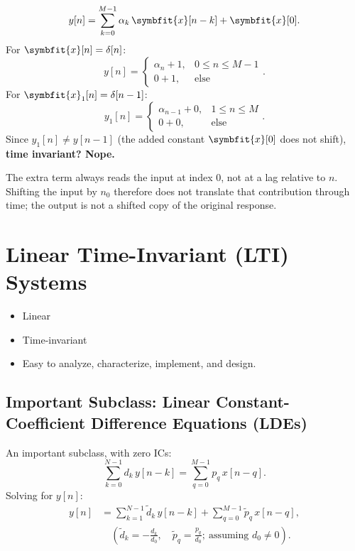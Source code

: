 \documentclass[handout_subfiles_root.tex]{subfiles}
\begin{document}
\begin{examplebox}[title={Example (A System that is \emph{Not} Time-Invariant)}]
$$y[n] = \sum_{k=0}^{M-1}\alpha_k\,\symbfit{x}[n-k] + \symbfit{x}[0].$$
For $\symbfit{x}[n] = \delta[n]$:
$$y[n] = \begin{cases} \alpha_n + 1, & 0\le n\le M-1\\ 0+1, & \text{else}
\end{cases}.$$
\noindent{}For $\symbfit{x}_1[n] = \delta[n-1]$:
$$y_1[n] = \begin{cases} \alpha_{n-1} + 0, & 1\le n\le M\\ 0+0, & \text{else}
\end{cases}.$$
Since $y_1[n] \ne y[n-1]$ (the added constant $\symbfit{x}[0]$ does not shift),
\textbf{time invariant? Nope.}

\noindent The extra term always reads the input at index $0$, not at a lag
relative to $n$. Shifting the input by $n_0$ therefore does not translate
that contribution through time; the output is not a shifted copy of the
original response.
\end{examplebox}

\section{Linear Time-Invariant (LTI) Systems}

\begin{itemize}
  \item Linear
  \item Time-invariant
  \item Easy to analyze, characterize, implement, and design.
\end{itemize}

\subsection{Important Subclass: Linear Constant-Coefficient Difference Equations (LDEs)}

An important subclass, with zero ICs:
$$\sum_{k=0}^{N-1} d_k\,y[n-k] = \sum_{q=0}^{M-1} p_q\,x[n-q].$$
Solving for $y[n]$:
\begin{align*}
y[n] &= \sum_{k=1}^{N-1} \tilde d_k\,y[n-k] + \sum_{q=0}^{M-1}\tilde p_q\,x[n-q], \\
&\quad\left(\tilde d_k = -\frac{d_k}{d_0}, \quad \tilde p_q = \frac{p_q}{d_0};\ \text{assuming } d_0 \ne 0\right).
\end{align*}
\end{document}
